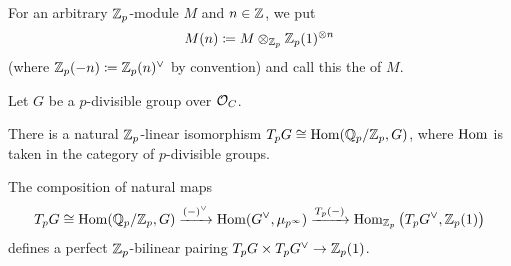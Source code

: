 \documentclass[a4paper, 10pt, oneside, DIV=9, chapterprefix=true, numbers=enddot,bibliography=totoc]{scrbook}
\begin{document}
\begin{defi}
	For an arbitrary $\mathbb{Z}_p$-module $M$ and $n\in \mathbb{Z}$, we put 
	\begin{equation*}
		M(n)\coloneqq M\otimes_{\mathbb{Z}_p}\mathbb{Z}_p(1)^{\otimes n}
	\end{equation*}
	(where $\mathbb{Z}_p(-n)\coloneqq \mathbb{Z}_p(n)^\vee$ by convention) and call this the  of $M$.
\end{defi}
\begin{lem}\label{lem:TpGHom}
	Let $G$ be a $p$-divisible group over $\mathcal{O}_C$.
	\begin{numerate}
		\item There is a natural $\mathbb{Z}_p$-linear isomorphism $T_pG\cong\operatorname{Hom}(\mathbb{Q}_p/\mathbb{Z}_p,G)$, where $\operatorname{Hom}$ is taken in the category of $p$-divisible groups.
		\item The composition of natural maps
		\begin{equation*}
			T_pG\cong\operatorname{Hom}(\mathbb{Q}_p/\mathbb{Z}_p,G)\xrightarrow{(-)^\vee}\operatorname{Hom}(G^\vee,\mu_{p^\infty})\xrightarrow{T_p(-)}\operatorname{Hom}_{\mathbb{Z}_p}\big(T_pG^\vee,\mathbb{Z}_p(1)\big)
		\end{equation*}
		defines a perfect $\mathbb{Z}_p$-bilinear pairing $T_pG\times T_pG^\vee\morphism \IZ_p(1)$.
	\end{numerate}
\end{lem}
\end{document}

